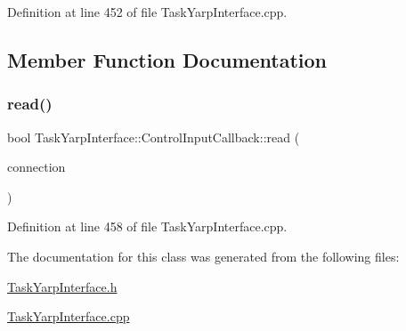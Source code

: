 Definition at line 452 of file Task\+Yarp\+Interface.\+cpp.



\subsection{Member Function Documentation}
\hypertarget{classocra_1_1TaskYarpInterface_1_1ControlInputCallback_a6b2e8af58d4625a70ea6f8217287be07}{}\label{classocra_1_1TaskYarpInterface_1_1ControlInputCallback_a6b2e8af58d4625a70ea6f8217287be07} 
\subsubsection{\texorpdfstring{read()}{read()}}
{\footnotesize\ttfamily bool Task\+Yarp\+Interface\+::\+Control\+Input\+Callback\+::read (\begin{DoxyParamCaption}\item[{yarp\+::os\+::\+Connection\+Reader \&}]{connection }\end{DoxyParamCaption})\hspace{0.3cm}{\ttfamily [virtual]}}



Definition at line 458 of file Task\+Yarp\+Interface.\+cpp.



The documentation for this class was generated from the following files\+:\begin{DoxyCompactItemize}
\item 
\hyperlink{TaskYarpInterface_8h}{Task\+Yarp\+Interface.\+h}\item 
\hyperlink{TaskYarpInterface_8cpp}{Task\+Yarp\+Interface.\+cpp}\end{DoxyCompactItemize}
